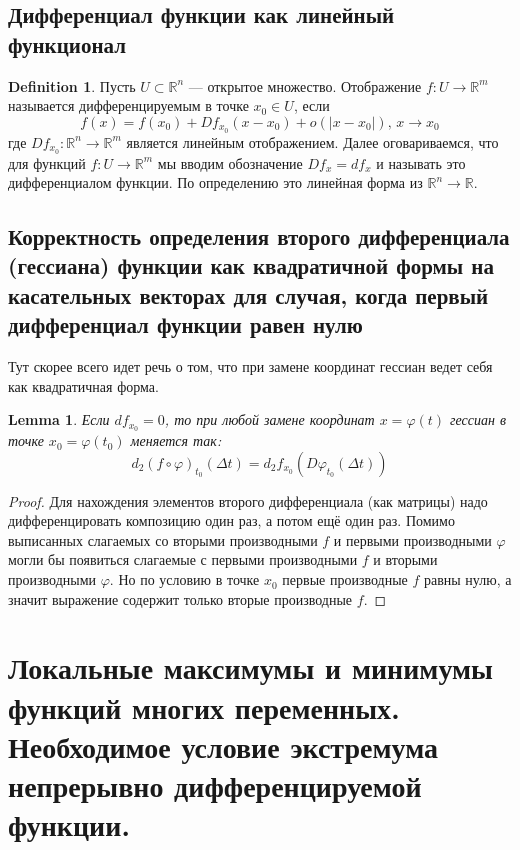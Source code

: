 \documentclass[a4paper,12pt]{article} %
\newtheorem{lemma}[theorem]{Lemma}
\theoremstyle{definition}
\newtheorem{definition}{Definition}[section]
\begin{document}
\subsection{Дифференциал функции как линейный функционал}
\begin{definition}
	Пусть $U \subset \mathbb{R}^n$ --- открытое множество. Отображение $f : U \rightarrow \mathbb{R}^m$ называется дифференцируемым в точке $x_0 \in U$, если
	\begin{equation}
		f(x) = f(x_0) + D f_{x_0} (x - x_0) + o(|x - x_0|), \, x \rightarrow x_0
	\end{equation}
	где $D f_{x_0} :  \mathbb{R}^n \rightarrow \mathbb{R}^m$ является линейным отображением. Далее оговариваемся, что для функций $f : U \rightarrow \mathbb{R}^m$  мы вводим обозначение $Df_x = df_x$ и называть это дифференциалом функции. По определению это линейная форма из $\mathbb{R}^n \rightarrow \mathbb{R}$.
\end{definition}
\subsection{Корректность определения второго дифференциала (гессиана) функции как квадратичной формы на касательных векторах для случая, когда первый дифференциал функции равен нулю}
Тут скорее всего идет речь о том, что при замене координат гессиан ведет себя как квадратичная форма. 
\begin{lemma}
	Если $df_{x_0} = 0$, то при любой замене координат $x = \varphi(t)$ гессиан в точке $x_0 = \varphi(t_0)$ меняется так:
	\begin{equation}
		d_2(f \circ \varphi)_{t_0}(\Delta t) = d_2 f_{x_0} (D \varphi_{t_0}(\Delta t))
	\end{equation}
\end{lemma}
\begin{proof}
	Для нахождения элементов второго дифференциала (как матрицы) надо дифференцировать композицию один раз, а потом ещё один раз. Помимо выписанных слагаемых со вторыми производными $f$ и первыми производными $\varphi$ могли бы появиться слагаемые с первыми производными $f$ и вторыми производными $\varphi$. Но по условию в точке $x_0$ первые производные $f$ равны нулю, а значит выражение содержит только вторые производные $f$.
\end{proof}
\section{Локальные максимумы и минимумы функций многих переменных. Необходимое условие экстремума непрерывно дифференцируемой функции.}
\end{document}
